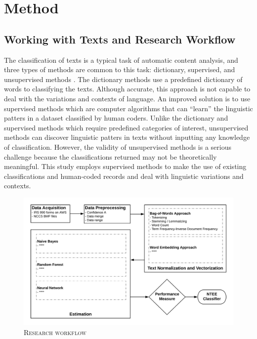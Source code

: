 \documentclass[12pt]{article}
\begin{document}


\section{Method}

\subsection{Working with Texts and Research Workflow}

The classification of texts is a typical task of automatic content analysis, and three types of methods are common to this task: dictionary, supervised, and unsupervised methods \parencite[268-269]{GrimmerTextDataPromise2013}. The dictionary methods use a predefined dictionary of words to classifying the texts. Although accurate, this approach is not capable to deal with the variations and contexts of language. An improved solution is to use supervised methods which are computer algorithms that can ``learn'' the linguistic patters in a dataset classified by human coders. Unlike the dictionary and supervised methods which require predefined categories of interest, unsupervised methods can discover linguistic patters in texts without inputting any knowledge of classification. However, the validity of unsupervised methods is a serious challenge because the classifications returned may not be theoretically meaningful. This study employs supervised methods to make the use of existing classifications and human-coded records and deal with linguistic variations and contexts. 

\begin{figure}
	\centering
	\caption{\textsc{Research workflow}} \label{fig:workflow}
	\includegraphics[width=1\textwidth]{tbl_fig/NTEE-workflow.png}
\end{figure}
\end{document}
